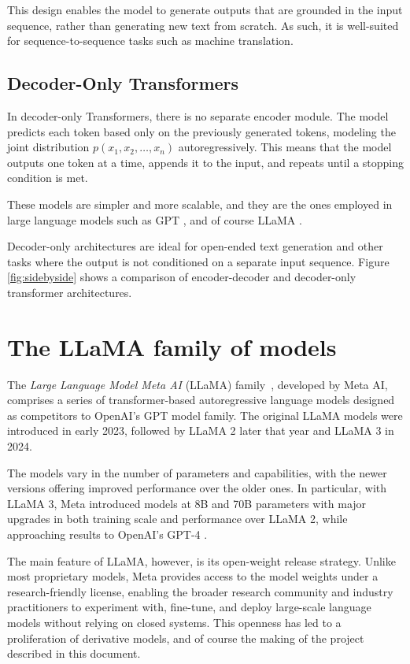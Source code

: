 This design enables the model to generate outputs that are grounded in the input sequence, rather than generating new text from scratch. As such, it is well-suited for sequence-to-sequence tasks such as machine translation.

\subsection{Decoder-Only Transformers}

In decoder-only Transformers, there is no separate encoder module. The model predicts each token based only on the previously generated tokens, modeling the joint distribution \( p(x_1, x_2, \ldots, x_n) \) autoregressively. This means that the model outputs one token at a time, appends it to the input, and repeats until a stopping condition is met.

These models are simpler and more scalable, and they are the ones employed in large language models such as GPT \cite{gpt}, and of course LLaMA \cite{llama}.

Decoder-only architectures are ideal for open-ended text generation and other tasks where the output is not conditioned on a separate input sequence.
Figure \ref{fig:sidebyside} shows a comparison of encoder-decoder and decoder-only transformer architectures.

\section{The LLaMA family of models}

The \textit{Large Language Model Meta AI} (LLaMA) family~\cite{llama3}, developed by Meta AI, comprises a series of transformer-based autoregressive language models designed as competitors to OpenAI's GPT model family. The original LLaMA models were introduced in early 2023, followed by LLaMA 2 \cite{llama2} later that year and LLaMA 3 in 2024.

The models vary in the number of parameters and capabilities, with the newer versions offering improved performance over the older ones. In particular, with LLaMA 3, Meta introduced models at 8B and 70B parameters with major upgrades in both training scale and performance over LLaMA 2, while approaching results to OpenAI's GPT-4 \cite{gpt4} \cite{llama3}.

The main feature of LLaMA, however, is its open-weight release strategy. Unlike most proprietary models, Meta provides access to the model weights under a research-friendly license, enabling the broader research community and industry practitioners to experiment with, fine-tune, and deploy large-scale language models without relying on closed systems. This openness has led to a proliferation of derivative models, and of course the making of the project described in this document.


